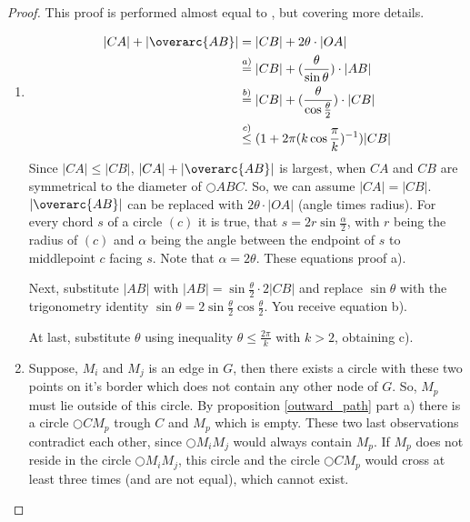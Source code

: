 \begin{proof}
This proof is performed almost equal to \cite{kanj}, but covering more details.
\renewcommand{\theenumi}{(\roman{enumi})}%
\begin{enumerate}
\item 
\begin{equation*}
\begin{split}
|CA|+|\overarc{AB}| &= |CB| + 2\theta \cdot |OA| \\
&\stackrel{a)}{=}|CB| + (\frac{\theta}{\sin{\theta}})\cdot |AB| \\
&\stackrel{b)}{=} |CB| + (\frac{\theta}{\cos{\frac{\theta}{2}}}) \cdot |CB|\\
&\stackrel{c)}{\leq} (1+2\pi(k \cos{\frac{\pi}{k}})^{-1}) |CB|  
\end{split}
\end{equation*}
Since $|CA| \leq |CB| $, $|CA|+|\overarc{AB}| $ is largest, when $CA $ and $CB $ are symmetrical to the diameter of $\bigcirc{ABC} $.
So, we can assume $|CA|=|CB| $.
$|\overarc{AB}| $ can be replaced with $2\theta \cdot |OA| $ (angle times radius).
For every chord $s $ of a circle $(c) $ it is true, that $s=2r\sin{\frac{\alpha}{2}} $, with $r $ being the radius of $(c) $ and $\alpha $ being the angle between the endpoint of $s $ to middlepoint $c $ facing $s $.
Note that $\alpha = 2\theta $. 
These equations proof a).

Next, substitute $|AB| $ with $|AB| = \sin{\frac{\theta}{2}} \cdot 2|CB| $ and replace $\sin{\theta} $ with the trigonometry identity $\sin{\theta}=2\sin{\frac{\theta}{2}} \cos{\frac{\theta}{2}} $.
You receive equation b).

At last, substitute $\theta $ using inequality $\theta \leq \frac{2\pi}{k} $ with $k > 2 $, obtaining c).

\item  Suppose, $M_i $ and $M_j $ is an edge in $G $, then there exists a circle with these two points on it's border which does not contain any other node of $G $.
So, $M_p $ must lie outside of this circle.
By proposition \ref{outward_path} part a) there is a circle $\bigcirc{CM_p} $ trough $C $ and $M_p $ which is empty.
These two last observations contradict each other, since $\bigcirc{M_iM_j} $ would always contain $M_p $.
If $M_p $ does not reside in the circle $\bigcirc{M_iM_j} $, this circle and the circle $\bigcirc{CM_p} $ would cross at least three times (and are not equal), which cannot exist.


\end{enumerate}
\end{proof}
